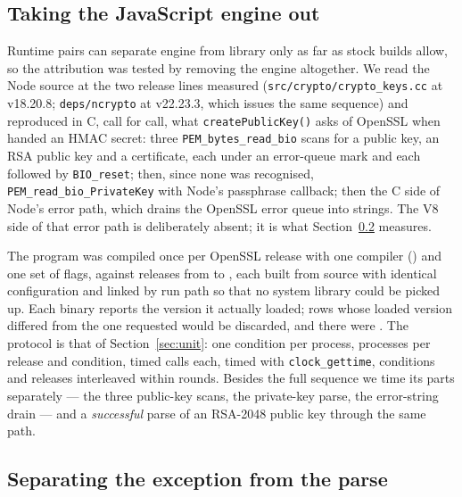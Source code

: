 \documentclass[pdflatex,sn-basic,twocolumn]{sn-jnl}%
\begin{document}
\subsection{Taking the JavaScript engine out}\label{sec:c-method}

Runtime pairs can separate engine from library only as far as stock builds
allow, so the attribution was tested by removing the engine altogether. We read
the Node source at the two release lines measured
(\texttt{src/crypto/crypto\_keys.cc} at v18.20.8; \texttt{deps/ncrypto} at
v22.23.3, which issues the same sequence) and reproduced in C, call for call,
what \texttt{createPublicKey()} asks of OpenSSL when handed an HMAC secret:
three \texttt{PEM\_bytes\_read\_bio} scans for a public key, an RSA public key
and a certificate, each under an error-queue mark and each followed by
\texttt{BIO\_reset}; then, since none was recognised,
\texttt{PEM\_read\_bio\_PrivateKey} with Node's passphrase callback; then the
C side of Node's error path, which drains the OpenSSL error queue into
strings. The V8 side of that error path is deliberately absent; it is what
Section~\ref{sec:exc-method} measures.

The program was compiled once per OpenSSL release with one compiler
(\CProbeCompiler) and one set of flags, against \CProbeVersionCount{} releases
from \CProbeVersionFirst{} to \CProbeVersionLast{}, each built from source with
identical configuration and linked by run path so that no system library could
be picked up. Each binary reports the version it actually loaded; rows whose
loaded version differed from the one requested would be discarded, and there
were \CProbeIdentityMismatches. The protocol is that of
Section~\ref{sec:unit}: one condition per process, \CProbeInvocations{}
processes per release and condition, \CProbeCallsPerInvocation{} timed calls
each, timed with \texttt{clock\_gettime}, conditions and releases interleaved
within rounds. Besides the full sequence we time its parts separately --- the
three public-key scans, the private-key parse, the error-string drain --- and a
\emph{successful} parse of an RSA-2048 public key through the same path.

\subsection{Separating the exception from the parse}\label{sec:exc-method}
\end{document}

